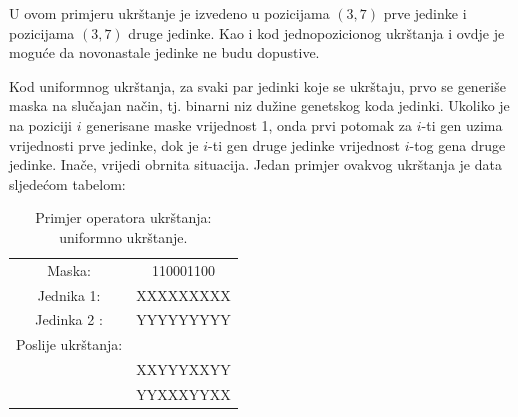 \documentclass[a4paper, utf8, 11pt, colorlinks]{book}
\begin{document}
U ovom primjeru ukrštanje je izvedeno u pozicijama $(3,7)$ prve jedinke i pozicijama $(3, 7)$ druge jedinke. Kao i kod jednopozicionog ukrštanja i ovdje je moguće da novonastale jedinke ne budu dopustive. 

Kod uniformnog ukrštanja, za svaki par jedinki koje se ukrštaju, prvo se generiše maska na slučajan način, tj. binarni niz dužine genetskog koda jedinki. Ukoliko je na poziciji $i$ generisane maske vrijednost 1, onda prvi potomak za $i$-ti gen uzima vrijednosti prve jedinke, dok je $i$-ti gen druge jedinke vrijednost $i$-tog gena druge jedinke. Inače, vrijedi obrnita situacija. Jedan primjer ovakvog ukrštanja je data sljedećom tabelom: 

\begin{table}[H]
	\centering
	
	\begin{tabular}{cc}
		Maska:      &   110001100   \\
		Jednika 1:  &	XXXXXXXXX   \\ 
		Jedinka 2 : &	YYYYYYYYY   \\
		Poslije ukrštanja:  &       \\ \hline
		            &  XXYYYXXYY    \\
		            &  YYXXXYYXX    \\
	\end{tabular}
	\caption{Primjer operatora ukrštanja: uniformno ukrštanje.}
\end{table}
\end{document}
